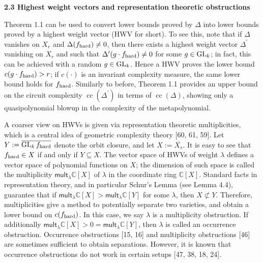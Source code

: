 \documentclass[10pt,a4paper]{article}
\begin{document}
\par\medskip\noindent\textbf{2.3 Highest weight vectors and representation theoretic obstructions}\par




Theorem 1.1 can be used to convert lower bounds proved by $\Delta$ into lower bounds proved by a highest weight vector (HWV for short). To see this, note that if $\Delta$ vanishes on $X_{r}$ and $\Delta(f_{\textup{hard}})\neq 0$, then there exists a highest weight vector $\Delta^{\prime}$ vanishing on $X_{r}$ and such that $\Delta^{\prime}(g\cdot f_{\textup{hard}})\neq 0$ for some $g\in\textnormal{GL}_{k}$; in fact, this can be achieved with a random $g\in\textnormal{GL}_{k}$.
Hence a HWV proves the lower bound $c(g\cdot f_{{\textup{hard}}})>r$; if $c(\cdot)$ is an invariant complexity measure, the same lower bound holds for $f_{{\textup{hard}}}$. Similarly to before, Theorem 1.1 provides an upper bound on the circuit complexity $\operatorname{cc}(\Delta^{\prime})$ in terms of $\operatorname{cc}(\Delta)$, showing only a quasipolynomial blowup in the complexity of the metapolynomial.





A coarser view on HWVs is given via representation theoretic multiplicities, which is a central idea of geometric complexity theory [60, 61, 59].
Let $Y:=\overline{\textnormal{GL}_{k}\,f_{\textup{hard}}}$ denote the orbit closure, and let $X:=\overline{X_{s}}$.
It is easy to see that $f_{\textup{hard}}\in X$ if and only if $Y\subseteq X$.
The vector space of HWVs of weight $\lambda$ defines a vector space of polynomial functions on $X$; the dimension of such space is called
the multiplicity $\mathsf{mult}_{\lambda}\mathbb{C}[X]$ of $\lambda$ in the coordinate ring $\mathbb{C}[X]$. Standard facts in representation theory, and in particular Schur’s Lemma (see Lemma 4.4), guarantee that if $\mathsf{mult}_{\lambda}\mathbb{C}[X]>\mathsf{mult}_{\lambda}\mathbb{C}[Y]$ for some $\lambda$, then $X\not\subset Y$. Therefore, multiplicities give a method to potentially separate two varieties, and obtain a lower bound on $c(f_{\textup{hard}})$.
In this case, we say $\lambda$ is a multiplicity obstruction. If additionally
$\mathsf{mult}_{\lambda}\mathbb{C}[X]>0=\mathsf{mult}_{\lambda}\mathbb{C}[Y]$, then $\lambda$ is called an occurrence obstruction.
Occurrence obstructions [15, 16] and multiplicity obstructions [46] are sometimes sufficient to obtain separations. However, it is known that occurrence obstructions do not work in certain setups [47, 38, 18, 24].
\end{document}
